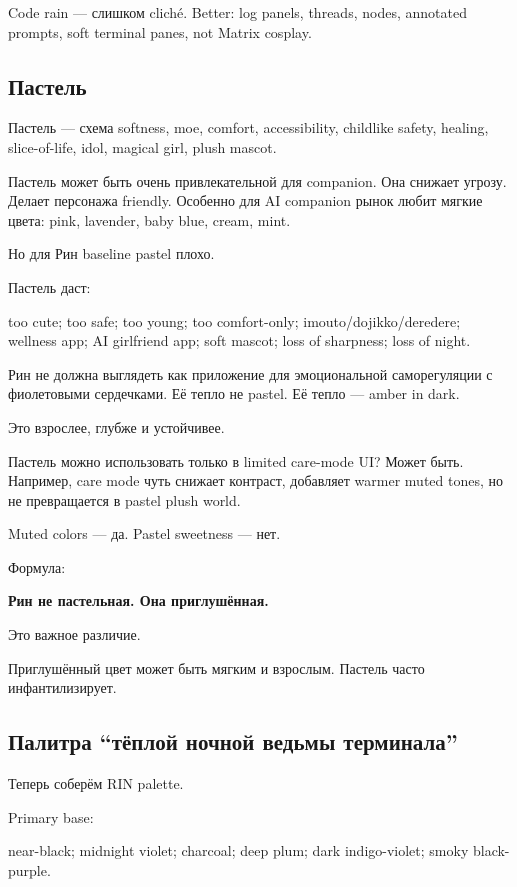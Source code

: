Code rain --- слишком cliché. Better: log panels, threads, nodes,
annotated prompts, soft terminal panes, not Matrix cosplay.

\subsection*{Пастель}

Пастель --- схема softness, moe, comfort, accessibility, childlike
safety, healing, slice-of-life, idol, magical girl, plush mascot.

Пастель может быть очень привлекательной для companion. Она снижает
угрозу. Делает персонажа friendly. Особенно для AI companion рынок любит
мягкие цвета: pink, lavender, baby blue, cream, mint.

Но для Рин baseline pastel плохо.

Пастель даст:

too cute; too safe; too young; too comfort-only;
imouto/\hspace{0pt}dojikko/\hspace{0pt}deredere; wellness app; AI girlfriend app; soft mascot;
loss of sharpness; loss of night.

Рин не должна выглядеть как приложение для эмоциональной саморегуляции с
фиолетовыми сердечками. Её тепло не pastel. Её тепло --- amber in dark.

Это взрослее, глубже и устойчивее.

Пастель можно использовать только в limited care-mode UI? Может быть.
Например, care mode чуть снижает контраст, добавляет warmer muted tones,
но не превращается в pastel plush world.

Muted colors --- да. Pastel sweetness --- нет.

Формула:

\textbf{Рин не пастельная. Она приглушённая.}

Это важное различие.

Приглушённый цвет может быть мягким и взрослым. Пастель часто
инфантилизирует.

\subsection*{Палитра ``тёплой ночной ведьмы терминала''}

Теперь соберём RIN palette.

Primary base:

near-black; midnight violet; charcoal; deep plum; dark indigo-violet;
smoky black-purple.

